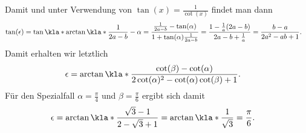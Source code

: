 \documentclass[english, parskip=full]{scrartcl}
\begin{document}
Damit und unter Verwendung von $\tan(x) = \frac{1}{\cot(x)}$ findet man dann
\begin{align}
\tan(\epsilon) &= \tan\kla*{\arctan\kla*{\frac{1}{2a - b}} - \alpha} = \frac{\frac{1}{2a - b} - \tan(\alpha)}{1 + \tan(\alpha) \frac{1}{2a - b}} = \frac{1 - \frac{1}{a} (2a - b)}{2a - b + \frac{1}{a}} = \frac{b - a}{2a^2 - ab + 1}.
\end{align}
%    
%    
%    
%    
%    
Damit erhalten wir letztlich
\begin{align}
\epsilon &= \arctan\kla*{\frac{\cot(\beta) - \cot(\alpha)}{2\cot(\alpha)^2 - \cot(\alpha) \cot(\beta) + 1}}.
\end{align}
Für den Spezialfall $\alpha=\frac{\pi}{4}$ und $\beta=\frac{\pi}{6}$ ergibt sich damit
\begin{align}
\epsilon &= \arctan\kla*{\frac{\sqrt{3} - 1}{2 - \sqrt{3} + 1}} = \arctan\kla*{\frac{1}{\sqrt{3}}} = \frac{\pi}{6}.
\end{align}
\newpage
\end{document}
